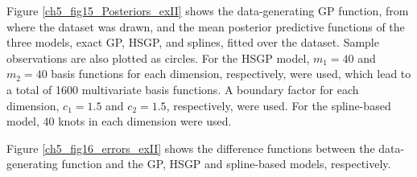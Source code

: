 \documentclass[onecolumn,a4paper,11pt]{article}
\begin{document}
Figure \ref{ch5_fig15_Posteriors_exII} shows the data-generating GP function, from where the dataset was drawn, and the mean posterior predictive functions of the three models, exact GP, HSGP, and splines, fitted over the dataset. Sample observations are also plotted as circles. For the HSGP model, $m_1=40$ and $m_2=40$ basis functions for each dimension, respectively, were used, which lead to a total of 1600 multivariate basis functions. A boundary factor for each dimension, $c_1=1.5$ and $c_2=1.5$, respectively, were used. For the spline-based model, 40 knots in each dimension were used.

Figure \ref{ch5_fig16_errors_exII} shows the difference functions between the data-generating function and the GP, HSGP and spline-based models, respectively.

\begin{figure}
\begin{center}
\begin{tabular}{ c c c}

\end{tabular}
\end{center}
\end{figure}
\end{document}

